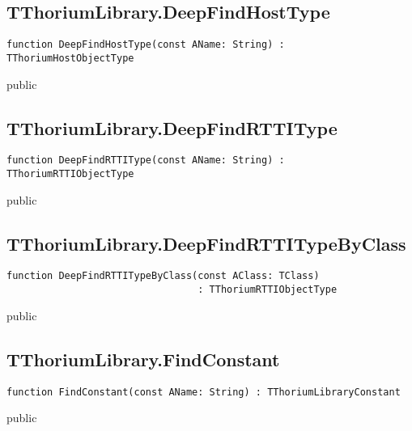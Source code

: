 \subsection{TThoriumLibrary.DeepFindHostType}
\label{thoriumcorepkg:thorium:tthoriumlibrary:deepfindhosttype}
\begin{FPCList}
\Declaration 

\begin{verbatim}
function DeepFindHostType(const AName: String) : TThoriumHostObjectType
\end{verbatim}
\Visibility
public
\end{FPCList}
\subsection{TThoriumLibrary.DeepFindRTTIType}
\label{thoriumcorepkg:thorium:tthoriumlibrary:deepfindrttitype}
\begin{FPCList}
\Declaration 

\begin{verbatim}
function DeepFindRTTIType(const AName: String) : TThoriumRTTIObjectType
\end{verbatim}
\Visibility
public
\end{FPCList}
\subsection{TThoriumLibrary.DeepFindRTTITypeByClass}
\label{thoriumcorepkg:thorium:tthoriumlibrary:deepfindrttitypebyclass}
\begin{FPCList}
\Declaration 

\begin{verbatim}
function DeepFindRTTITypeByClass(const AClass: TClass)
                                 : TThoriumRTTIObjectType
\end{verbatim}
\Visibility
public
\end{FPCList}
\subsection{TThoriumLibrary.FindConstant}
\label{thoriumcorepkg:thorium:tthoriumlibrary:findconstant}
\begin{FPCList}
\Declaration 

\begin{verbatim}
function FindConstant(const AName: String) : TThoriumLibraryConstant
\end{verbatim}
\Visibility
public
\end{FPCList}
